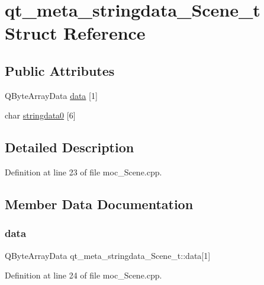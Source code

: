 \hypertarget{structqt__meta__stringdata___scene__t}{}\section{qt\+\_\+meta\+\_\+stringdata\+\_\+\+Scene\+\_\+t Struct Reference}
\label{structqt__meta__stringdata___scene__t}
\subsection*{Public Attributes}
\begin{DoxyCompactItemize}
\item 
Q\+Byte\+Array\+Data \mbox{\hyperlink{structqt__meta__stringdata___scene__t_a1d69f2d6cf4eca66c506f736acf9a29e}{data}} \mbox{[}1\mbox{]}
\item 
char \mbox{\hyperlink{structqt__meta__stringdata___scene__t_a8b3968eedbb9fdf96697b1b36ddf2cad}{stringdata0}} \mbox{[}6\mbox{]}
\end{DoxyCompactItemize}


\subsection{Detailed Description}


Definition at line 23 of file moc\+\_\+\+Scene.\+cpp.



\subsection{Member Data Documentation}
\mbox{\label{structqt__meta__stringdata___scene__t_a1d69f2d6cf4eca66c506f736acf9a29e}} 
\subsubsection{\texorpdfstring{data}{data}}
{\footnotesize\ttfamily Q\+Byte\+Array\+Data qt\+\_\+meta\+\_\+stringdata\+\_\+\+Scene\+\_\+t\+::data\mbox{[}1\mbox{]}}



Definition at line 24 of file moc\+\_\+\+Scene.\+cpp.

\mbox{\label{structqt__meta__stringdata___scene__t_a8b3968eedbb9fdf96697b1b36ddf2cad}} 
